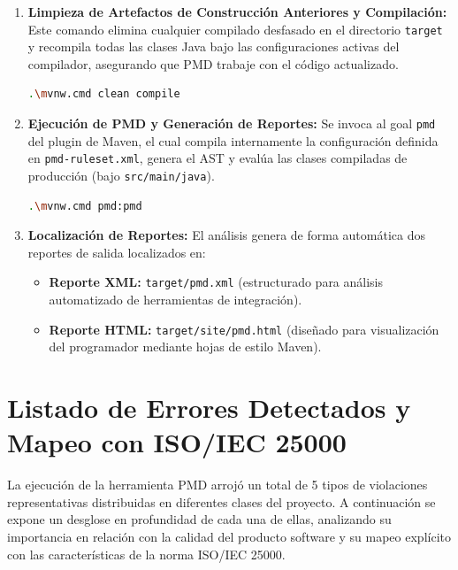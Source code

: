 \documentclass[12pt,a4paper]{article}
\begin{document}
\begin{enumerate}
    \item \textbf{Limpieza de Artefactos de Construcción Anteriores y Compilación:}
    Este comando elimina cualquier compilado desfasado en el directorio \texttt{target} y recompila todas las clases Java bajo las configuraciones activas del compilador, asegurando que PMD trabaje con el código actualizado.
    \begin{lstlisting}[language=bash]
    .\mvnw.cmd clean compile
    \end{lstlisting}
    
    \item \textbf{Ejecución de PMD y Generación de Reportes:}
    Se invoca al goal \texttt{pmd} del plugin de Maven, el cual compila internamente la configuración definida en \texttt{pmd-ruleset.xml}, genera el AST y evalúa las clases compiladas de producción (bajo \texttt{src/main/java}).
    \begin{lstlisting}[language=bash]
    .\mvnw.cmd pmd:pmd
    \end{lstlisting}
    
    \item \textbf{Localización de Reportes:}
    El análisis genera de forma automática dos reportes de salida localizados en:
    \begin{itemize}
        \item \textbf{Reporte XML:} \texttt{target/pmd.xml} (estructurado para análisis automatizado de herramientas de integración).
        \item \textbf{Reporte HTML:} \texttt{target/site/pmd.html} (diseñado para visualización del programador mediante hojas de estilo Maven).
    \end{itemize}
\end{enumerate}

\newpage

\section{Listado de Errores Detectados y Mapeo con ISO/IEC 25000}
La ejecución de la herramienta PMD arrojó un total de 5 tipos de violaciones representativas distribuidas en diferentes clases del proyecto. A continuación se expone un desglose en profundidad de cada una de ellas, analizando su importancia en relación con la calidad del producto software y su mapeo explícito con las características de la norma ISO/IEC 25000.
\end{document}
